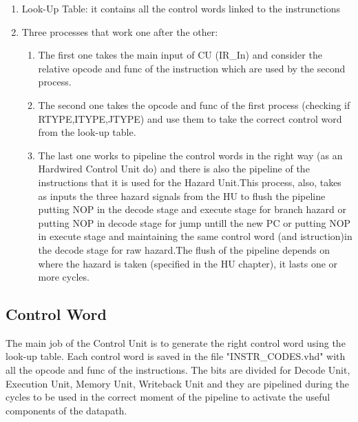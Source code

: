 \begin{enumerate} 
    \item Look-Up Table: it contains all the control words linked to the instrunctions
    \item Three processes that work one after the other:
    \begin{enumerate}
    \item The first one takes the main input of CU (IR\_In) and consider the relative opcode and func of the instruction which are used by the second process.
    \item The second one takes the opcode and func of the first process (checking if RTYPE,ITYPE,JTYPE) and use them to take the correct control word from the look-up table.
    \item The last one works to pipeline the control words in the right way (as an Hardwired Control Unit do) and there is also the pipeline of the instructions that it is used for the Hazard Unit.This process, also, takes as inputs the three hazard signals from the HU to flush the pipeline putting NOP in the decode stage and execute stage for branch hazard or putting NOP in decode stage for jump untill the new PC or putting NOP in execute stage and maintaining the same control word (and istruction)in the decode stage for raw hazard.The flush of the pipeline depends on where the hazard is taken (specified in the HU chapter), it lasts one or more cycles. 
    \end{enumerate}
\end{enumerate}
\subsection{Control Word}
The main job of the Control Unit is to generate the right control word using the look-up table. Each control word is saved in the file "INSTR\_CODES.vhd" with all the opcode and func of the instructions.
The bits are divided for Decode Unit, Execution Unit, Memory Unit, Writeback Unit and they are pipelined during the cycles to be used in the correct moment of the pipeline to activate the useful components of the datapath.

